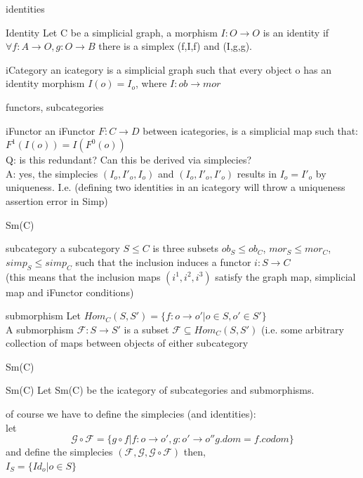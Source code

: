 \documentclass[11pt]{beamer}
\begin{document}
\begin{frame}{identities}
    \begin{block}{Identity}
        Let C be a simplicial graph, a morphism $I:O \to O$ is an identity if $\forall f:A \to O, g:O \to B$ there is a simplex (f,I,f) and (I,g,g). 
    \end{block}
    \begin{block}{iCategory}
    an icategory is a simplicial graph such that every object o has an identity morphism $I(o) = I_o$, where $I:ob \to mor$
    \end{block}
\end{frame}

\begin{frame}{functors, subcategories}
    \begin{block}{iFunctor}
        an iFunctor $F:C \to D$ between icategories, is a simplicial map such that:\\
        $F^1(I(o)) = I(F^0(o))$\\
        Q: is this redundant? Can this be derived via simplecies?\\
        A: yes, the simplecies $(I_o,I'_o,I_o)$ and $(I_o,I'_o,I'_o)$ results in $I_o = I'_o$ by uniqueness. I.e. (defining two identities in an icategory will throw a uniqueness assertion error in Simp)
    \end{block}
\end{frame}

\begin{frame}{Sm(C)}
    \begin{block}{subcategory}
    a subcategory $S\leq C$ is three subsets $ob_S\leq ob_C$, $mor_S \leq mor_C$, $simp_S \leq simp_C$ such that the inclusion induces a functor $i:S \to C$ \\
    (this means that the inclusion maps $(i^1,i^2,i^3)$ satisfy the graph map, simplicial map and iFunctor conditions)
    \end{block}
    \begin{block}{submorphism}
    Let $Hom_{C}(S,S') = \{f:o \to o'|o \in S, o'\in S'\}$\\
    A submorphism $\mathcal F: S \to  S'$ is a subset $\mathcal F \subseteq Hom_{C}(S,S')$ (i.e. some arbitrary collection of maps between objects of either subcategory
    \end{block}
\end{frame}

\begin{frame}{Sm(C)}
\begin{block}{Sm(C)}
Let Sm(C) be the icategory of subcategories and submorphisms. 
\end{block}

of course we have to define the simplecies (and identities):\\
let $$\mathcal G \circ \mathcal F = \{g\circ f|f:o \to o',g:o' \to o'' g.dom = f.codom\}$$ and define the simplecies $(\mathcal F,\mathcal G,\mathcal G \circ \mathcal F)$ then,\\
$I_S = \{Id_o|o\in S\}$
\end{frame}
\end{document}
